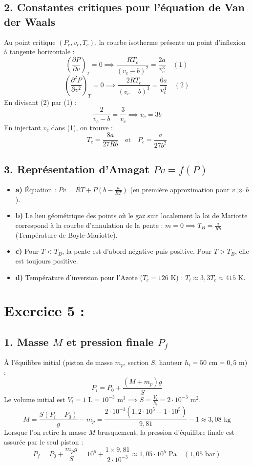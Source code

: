 \documentclass[a4paper,12pt]{article}
\begin{document}
 	\subsection*{2. Constantes critiques pour l'équation de Van der Waals}
 	Au point critique $(P_c, v_c, T_c)$, la courbe isotherme présente un point d'inflexion à tangente horizontale :
 	\[ \left(\frac{\partial P}{\partial v}\right)_T = 0 \implies \frac{RT_c}{(v_c-b)^2} = \frac{2a}{v_c^3} \quad (1) \]
 	\[ \left(\frac{\partial^2 P}{\partial v^2}\right)_T = 0 \implies \frac{2RT_c}{(v_c-b)^3} = \frac{6a}{v_c^4} \quad (2) \]
 	En divisant (2) par (1) :
 	\[ \frac{2}{v_c - b} = \frac{3}{v_c} \implies v_c = 3b \]
 	En injectant $v_c$ dans (1), on trouve :
 	\[ T_c = \frac{8a}{27Rb} \quad \text{et} \quad P_c = \frac{a}{27b^2} \]
 	
 	\subsection*{3. Représentation d'Amagat $Pv = f(P)$}
 	\begin{itemize}
 		\item \textbf{a)} Équation : $Pv = RT + P\left(b - \frac{a}{RT}\right)$ (en première approximation pour $v \gg b$).
 		\item \textbf{b)} Le lieu géométrique des points où le gaz suit localement la loi de Mariotte correspond à la courbe d'annulation de la pente : $m = 0 \implies T_B = \frac{a}{Rb}$ (Température de Boyle-Mariotte).
 		\item \textbf{c)} Pour $T < T_B$, la pente est d'abord négative puis positive. Pour $T > T_B$, elle est toujours positive.
 		\item \textbf{d)} Température d'inversion pour l'Azote ($T_c = 126\text{ K}$) : $T_i \approx 3,3 T_c \approx 415\text{ K}$.
 	\end{itemize}
 	
 	\section*{Exercice 5 : }
 	\subsection*{1. Masse $M$ et pression finale $P_f$}
 	À l'équilibre initial (piston de masse $m_p$, section $S$, hauteur $h_i = 50\text{ cm} = 0,5\text{ m}$) :
 	\[ P_i = P_0 + \frac{(M+m_p)g}{S} \]
 	Le volume initial est $V_i = 1\text{ L} = 10^{-3}\text{ m}^3 \implies S = \frac{V_i}{h_i} = 2\cdot 10^{-3}\text{ m}^2$.
 	\[ M = \frac{S(P_i - P_0)}{g} - m_p = \frac{2\cdot 10^{-3}(1,2\cdot 10^5 - 1\cdot 10^5)}{9,81} - 1 \approx 3,08\text{ kg} \]
 	Lorsque l'on retire la masse $M$ brusquement, la pression d'équilibre finale est assurée par le seul piston :
 	\[ P_f = P_0 + \frac{m_p g}{S} = 10^5 + \frac{1 \times 9,81}{2\cdot 10^{-3}} \approx 1,05 \cdot 10^5\text{ Pa} \quad (1,05\text{ bar}) \]
 	
\end{document}
